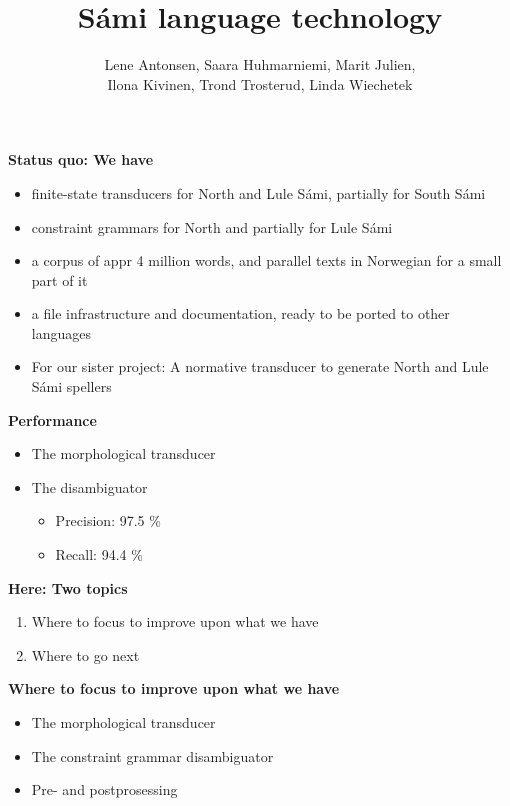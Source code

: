 \documentclass[landscape,english,11pt]{seminar}
\title{Sámi language technology}
\author{Lene Antonsen, 
Saara Huhmarniemi, 
Marit Julien, \\
Ilona Kivinen, 
Trond Trosterud, 
Linda Wiechetek}
\begin{document}
\begin{slide}

\maketitle

\newslide
\textbf{Status quo: We have}
\begin{itemize}
\item finite-state transducers for North and Lule Sámi, partially for South Sámi
\item constraint grammars for North and partially for Lule Sámi
\item a corpus of appr 4 million words, and parallel texts in Norwegian for a small part of it
\item a file infrastructure and documentation, ready to be ported to other languages
\item For our sister project: A normative transducer to generate North and Lule Sámi spellers
\end{itemize}


\newslide
\textbf{Performance}
\begin{itemize}
\item The morphological transducer
\item The disambiguator
\begin{itemize}
\item Precision: 97.5 \%
\item Recall: 94.4 \%
\end{itemize}
\end{itemize}

\newslide
\textbf{Here: Two topics}
\begin{enumerate}
\item Where to focus to improve upon what we have
\item Where to go next
\end{enumerate}


\newslide
\textbf{Where to focus to improve upon what we have}
\begin{itemize}
\item The morphological transducer
\item The constraint grammar disambiguator
\item Pre- and postprosessing
\end{itemize}




\end{slide}
\end{document}
